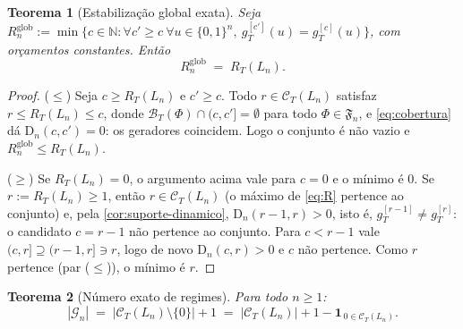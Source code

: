 \documentclass[11pt,a4paper]{article}
\newtheorem{theorem}{Teorema}[section]
\theoremstyle{definition}
\theoremstyle{remark}
\newcommand{\N}{\mathbb{N}}
\begin{document}
\begin{theorem}[Estabilização global exata]\label{thm:estab-global}
Seja $R^{\mathrm{glob}}_n := \min\{c \in \N : \forall c' \geq c\
\forall u \in \{0,1\}^n,\ g_T^{[c']}(u) = g_T^{[c]}(u)\}$, com
orçamentos constantes. Então
\begin{equation}\label{eq:estab-global}
  R^{\mathrm{glob}}_n \;=\; R_T(L_n).
\end{equation}
\end{theorem}

\begin{proof}
($\leq$) Seja $c \geq R_T(L_n)$ e $c' \geq c$. Todo
$r \in \mathcal{C}_T(L_n)$ satisfaz $r \leq R_T(L_n) \leq c$, donde
$\mathcal{B}_T(\Phi) \cap (c, c'] = \emptyset$ para todo
$\Phi \in \mathfrak{F}_n$, e \eqref{eq:cobertura} dá
$\mathrm{D}_n(c, c') = 0$: os geradores coincidem. Logo o conjunto é
não vazio e $R^{\mathrm{glob}}_n \leq R_T(L_n)$.

($\geq$) Se $R_T(L_n) = 0$, o argumento acima vale para $c = 0$ e o
mínimo é $0$. Se $r := R_T(L_n) \geq 1$, então
$r \in \mathcal{C}_T(L_n)$ (o máximo de \eqref{eq:R} pertence ao
conjunto) e, pela \cref{cor:suporte-dinamico},
$\mathrm{D}_n(r-1, r) > 0$, isto é, $g_T^{[r-1]} \neq g_T^{[r]}$: o
candidato $c = r-1$ não pertence ao conjunto. Para $c < r-1$ vale
$(c, r] \supseteq (r-1, r] \ni r$, logo de novo
$\mathrm{D}_n(c, r) > 0$ e $c$ não pertence. Como $r$ pertence (par
($\leq$)), o mínimo é $r$.
\end{proof}

\begin{theorem}[Número exato de regimes]\label{thm:regimes}
Para todo $n \geq 1$:
\begin{equation}\label{eq:regimes}
  |\mathcal{G}_n| \;=\; \bigl|\mathcal{C}_T(L_n) \setminus \{0\}\bigr| + 1
  \;=\; |\mathcal{C}_T(L_n)| + 1 - \mathbf{1}_{\,0 \in \mathcal{C}_T(L_n)} .
\end{equation}
\end{theorem}
\end{document}
